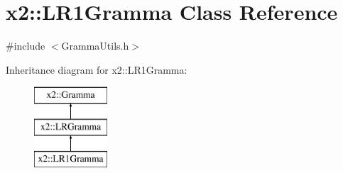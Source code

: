 \hypertarget{classx2_1_1_l_r1_gramma}{}\section{x2\+:\+:L\+R1\+Gramma Class Reference}
\label{classx2_1_1_l_r1_gramma}


{\ttfamily \#include $<$Gramma\+Utils.\+h$>$}

Inheritance diagram for x2\+:\+:L\+R1\+Gramma\+:\begin{figure}[H]
\begin{center}
\leavevmode
\includegraphics[height=3.000000cm]{classx2_1_1_l_r1_gramma}
\end{center}
\end{figure}
